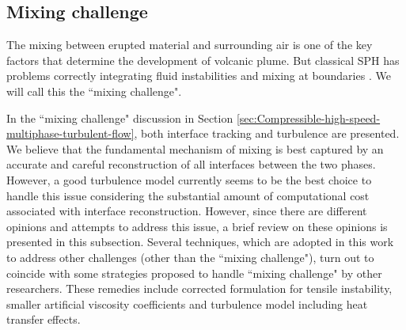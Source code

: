 \subsection{Mixing challenge}

The mixing between erupted material and surrounding air is one of the key factors that determine the development of volcanic plume. 
But classical SPH has problems correctly integrating fluid instabilities and mixing at boundaries \citep{read2010resolving}. We will call this the ``mixing challenge".

In the ``mixing challenge" discussion in Section \ref{sec:Compressible-high-speed-multiphase-turbulent-flow}, both interface tracking and turbulence are presented. We believe that the fundamental mechanism of mixing is best captured by  an accurate and careful reconstruction of all interfaces between the two phases. However, a good turbulence model currently seems to be the best choice to handle this issue considering the substantial amount of computational cost associated with interface reconstruction. However, since there are different opinions and attempts to address this issue, a brief review on these opinions is presented in this subsection. Several techniques, which are adopted in this work to address other challenges (other than the ``mixing challenge"), turn out to coincide with some strategies proposed to handle ``mixing challenge" by other researchers. These remedies include corrected formulation for tensile instability, smaller artificial viscosity coefficients and turbulence model including heat transfer effects.

